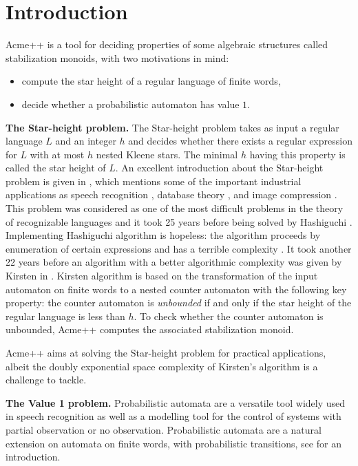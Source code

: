 \section{Introduction}

Acme++ is a tool for deciding properties of some algebraic structures called stabilization monoids,
with two motivations in mind:
\begin{itemize}
\item compute the star height of a regular language of finite words,
\item decide whether a probabilistic automaton has value $1$.
\end{itemize}

\textbf{The Star-height problem.} The Star-height problem takes as input a regular language $L$ and an integer $h$ and decides whether there exists a regular expression for $L$ with at most $h$ nested Kleene stars.
The minimal $h$ having this property is called the star height of $L$. 
An excellent introduction about the Star-height problem is given in \cite{Kirsten05},
which mentions some of the important industrial applications as
speech recognition \cite{Mohri97}, database theory \cite{GT01}, and image compression \cite{CK93,KMT04}.
This problem was considered as one of the most difficult problems in the theory of recognizable languages
and it took 25 years before being solved by Hashiguchi \cite{Hashiguchi88}.
Implementing Hashiguchi algorithm is hopeless: the algorithm proceeds by enumeration of certain expressions
and has a terrible complexity \cite{LS02}.
It took another 22 years before an algorithm with a better algorithmic complexity was given by Kirsten in \cite{Kirsten05}. Kirsten algorithm is based on the transformation of the input automaton on finite words to 
a nested counter automaton with the following key property: the counter automaton is \emph{unbounded}
if and only if the star height of the regular language is less than $h$. To check whether the
counter automaton is unbounded, Acme++ computes the associated stabilization monoid.

Acme++ aims at solving the Star-height problem for practical applications,
albeit the doubly exponential space complexity of Kirsten's algorithm is a challenge to tackle.


\textbf{The Value 1 problem.} Probabilistic automata are a versatile tool widely used in speech recognition as well as a modelling tool for the control of systems with partial observation or no observation.
Probabilistic automata are a natural extension on automata on finite words,
with probabilistic transitions, see \cite{Rabin63} for an introduction.

